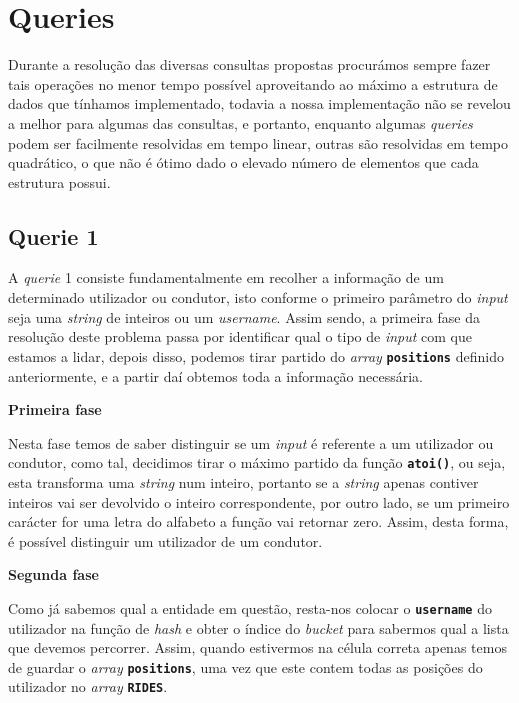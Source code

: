 \documentclass[12pt,a4paper]{report}
\begin{document}
\chapter{Queries}

Durante a resolução das diversas consultas propostas procurámos sempre fazer tais operações no menor tempo possível aproveitando ao máximo a estrutura de dados que tínhamos implementado, todavia a nossa implementação não se revelou a melhor para algumas das consultas, e portanto, enquanto algumas \textit{queries} podem ser facilmente resolvidas em tempo linear, outras são resolvidas em tempo quadrático, o que não é ótimo dado o elevado número de elementos que cada estrutura possui.

\section{Querie 1}

A \textit{querie} 1 consiste fundamentalmente em recolher a informação de um determinado utilizador ou condutor, isto conforme o primeiro parâmetro do \textit{input} seja uma \textit{string} de inteiros ou um \textit{username}. Assim sendo, a primeira fase da resolução deste problema passa por identificar qual o tipo de \textit{input} com que estamos a lidar, depois disso, podemos tirar partido do \textit{array} \textbf{\small\texttt{positions}} definido anteriormente, e a partir daí obtemos toda a informação necessária.    

\normalsize\textbf{Primeira fase }{\titlerule[0.5pt]}

Nesta fase temos de saber distinguir se um \textit{input} é referente a um utilizador ou condutor, como tal, decidimos tirar o máximo partido da função \textbf{\small\texttt{atoi()}}, ou seja, esta transforma uma \textit{string} num inteiro, portanto se a \textit{string} apenas contiver inteiros vai ser devolvido o inteiro correspondente, por outro lado, se um primeiro carácter for uma letra do alfabeto a função vai retornar zero. Assim, desta forma, é possível distinguir um utilizador de um condutor.  

\normalsize\textbf{Segunda fase }{\titlerule[0.5pt]}

Como já sabemos qual a entidade em questão, resta-nos colocar o \textbf{\small\texttt{username}} do utilizador na função de \textit{hash} e obter o índice do \textit{bucket} para sabermos qual a lista que devemos percorrer. Assim, quando estivermos na célula correta apenas temos de guardar o \textit{array} \textbf{\small\texttt{positions}}, uma vez que este contem todas as posições do utilizador no \textit{array} \textbf{\small\texttt{RIDES}}.
\end{document}
